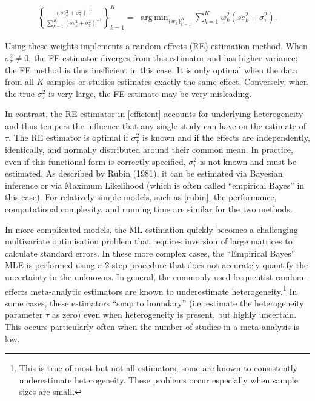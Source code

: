 \documentclass[12pt]{article}
\DeclareMathOperator*{\argmin}{arg\,min}
\begin{document}
 \begin{equation}\label{efficient}
\begin{aligned}
\left\{ \frac{(se^2_k+ \sigma^2_{\tau})^{-1}}{\sum_{k=1}^K(se^2_k+ \sigma^2_{\tau})^{-1}} \right\}_{k=1}^K = \; \argmin_{ \{w_k\}_{k=1}^K  } \sum_{k=1}^{K} w_k^2 (se^2_{k}+ \sigma^2_{\tau}).
\end{aligned}
\end{equation}

Using these weights implements a random effects (RE) estimation method. When $\sigma^2_{\tau} \neq 0$, the FE estimator diverges from this estimator and has higher variance: the FE method is thus inefficient in this case. It is only optimal when the data from all $K$ samples or studies estimates exactly the same effect. Conversely, when the true $\sigma^2_{\tau}$ is very large, the FE estimate may be very misleading. 

In contrast, the RE estimator in \eqref{efficient} accounts for underlying heterogeneity and thus tempers the influence that any single study can have on the estimate of $\tau$. The RE estimator is optimal if $\sigma^2_{\tau}$ is known and if the effects are independently, identically, and normally distributed around their common mean. 
In practice, even if this functional form is correctly specified, $\sigma^2_{\tau}$ is not known and must be estimated. As described by Rubin (1981), it can be estimated via Bayesian inference or via Maximum Likelihood (which is often called ``empirical Bayes'' in this case). For relatively simple models, such as \eqref{rubin}, the performance, computational complexity, and running time are similar for the two methods. 

In more complicated models, the ML estimation quickly becomes a challenging multivariate optimisation problem that requires inversion of large matrices to calculate standard errors. In these more complex cases, the ``Empirical Bayes'' MLE is performed using a 2-step procedure that does not accurately quantify the uncertainty in the unknowns. In general, the commonly used frequentist random-effects meta-analytic estimators are known to underestimate heterogeneity.\footnote{This is true of most but not all estimators; some are known to consistently underestimate heterogeneity. These problems occur especially when sample sizes are small.} In some cases, these estimators ``snap to boundary'' (i.e. estimate the heterogeneity parameter $\tau$ as zero) even when heterogeneity is present, but highly uncertain. This occurs particularly often when the number of studies in a meta-analysis is low.
\end{document}
